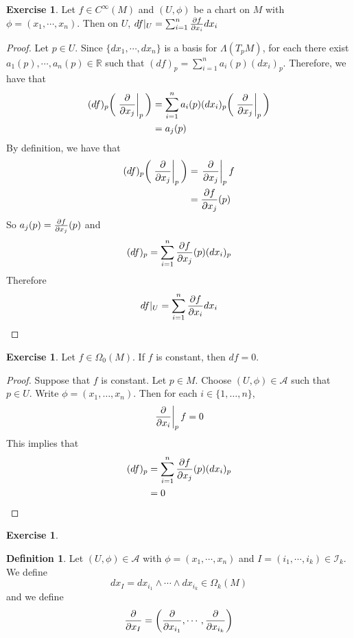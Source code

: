 \documentclass[12pt]{amsart}
\theoremstyle{definition}
\newtheorem{defn}[definition]{Definition}
\theoremstyle{remark}
\theoremstyle{definition}
\newtheorem{ex}[definition]{Exercise}
\newcommand{\Lam}{\Lambda}
\newcommand{\Om}{\Omega}
\newcommand{\R}{\mathbb{R}}
\newcommand{\MA}{\mathcal{A}}
\newcommand{\MI}{\mathcal{I}}
\begin{document}
	\begin{ex}
		Let $f \in C^{\infty}(M)$ and $(U, \phi)$ be a chart on $M$ with $\phi = (x_1, \cdots, x_n)$. Then on $U$, $df|_U = \sum_{i=1}^n \pdv{f}{x_i} dx_i$
	\end{ex}

	\begin{proof}
		Let $p \in U$. Since $\{dx_1, \cdots, dx_n\}$ is a basis for $\Lam(T_pM)$, for each there exist $a_1(p), \cdots, a_n(p) \in \R$ such that $(df)_p = \sum\limits_{i=1}^n a_i(p)(dx_i)_p$. Therefore, we have that 
		\begin{align*}
			(df)_p \bigg(\eval{\pdv{x_j}}_{p} \bigg) 
			&= \sum\limits_{i=1}^n a_i(p)(dx_i)_p \bigg(\eval{\pdv{x_j}}_{p} \bigg)  \\
			&=  a_j(p)
		\end{align*}
		By definition, we have that 
		\begin{align*}
			(df)_p\bigg(\eval{\pdv{x_j}}_{p} \bigg) 
			&= \eval{\pdv{x_j}}_{p} f \\ 
			&= {\pdv{f}{x_j}}(p)\\
		\end{align*}
		So $a_j(p) = {\pdv{f}{x_j}}(p)$ and $$(df)_p = \sum\limits_{i=1}^n {\pdv{f}{x_j}}(p)(dx_i)_p$$
		Therefore $$df|_U = \sum\limits_{i=1}^n {\pdv{f}{x_i}}dx_i$$
	\end{proof}
	
	\begin{ex}
	Let $f \in \Om_0(M)$. If $f$ is constant, then $df = 0$. 
	\end{ex}
	
	\begin{proof}
	Suppose that $f$ is constant. Let $p \in M$. Choose $(U, \phi) \in \MA$ such that $p \in U$. Write $\phi = (x_1, \dots, x_n)$. Then for each $i \in \{1, \dots, n\}$, $$\eval{\pdv{x_i}}_p f = 0$$ This implies that 
	\begin{align*}
	(df)_p 
	&= \sum\limits_{i=1}^n {\pdv{f}{x_j}}(p)(dx_i)_p \\
	&= 0
	\end{align*}
	\end{proof}
	
	\begin{ex}
	
	\end{ex}

	\begin{defn}
		Let $(U, \phi) \in \MA$ with $\phi = (x_1, \cdots, x_n)$ and $I = (i_1, \cdots, i_k) \in \MI_k$. We define $$dx_I = dx_{i_1} \wedge \cdots \wedge dx_{i_k} \in \Om_k(M)$$ 
		and we define $$\pdv{x_I}= \bigg(\pdv{x_{i_1}}, \cdots, \pdv{x_{i_k}} \bigg)$$

	\end{defn}
\end{document}

